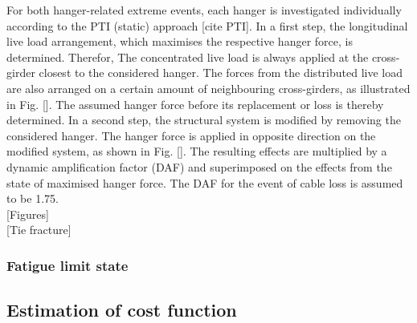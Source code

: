 

For both hanger-related extreme events, each hanger is investigated individually according to the PTI (static) approach [cite PTI]. In a first step, the longitudinal live load arrangement, which maximises the respective hanger force, is determined. Therefor, The concentrated live load is always applied at the cross-girder closest to the considered hanger. The forces from the distributed live load are also arranged on a certain amount of neighbouring cross-girders, as illustrated in Fig. []. The assumed hanger force before its replacement or loss is thereby determined. In a second step, the structural system is modified by removing the considered hanger. The hanger force is applied in opposite direction on the modified system, as shown in Fig. []. The resulting effects are multiplied by a dynamic amplification factor (DAF) and superimposed on the effects from the state of maximised hanger force. The DAF for the event of cable loss is assumed to be 1.75.\\

[Figures]\\

[Tie fracture]

\subsubsection{Fatigue limit state}



\subsection{Estimation of cost function} \label{sec:met_cost}
